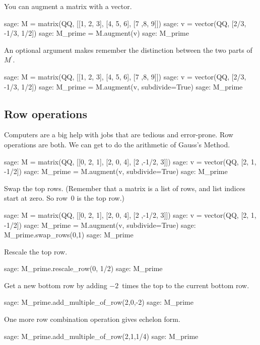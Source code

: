 You can augment a matrix with a vector.
\begin{sagecommandline}
sage: M = matrix(QQ, [[1, 2, 3], [4, 5, 6], [7 ,8, 9]])
sage: v = vector(QQ, [2/3, -1/3, 1/2])
sage: M_prime = M.augment(v)
sage: M_prime
\end{sagecommandline}
\noindent
An optional argument makes 
\Sage{} remember the distinction between the two parts 
of $M^\prime$.
\begin{sagecommandline}
sage: M = matrix(QQ, [[1, 2, 3], [4, 5, 6], [7 ,8, 9]])
sage: v = vector(QQ, [2/3, -1/3, 1/2])
sage: M_prime = M.augment(v, subdivide=True)
sage: M_prime                              
\end{sagecommandline}



\subsection{Row operations}
Computers are a big help with jobs that are tedious and error-prone.
Row operations are both.
We can get \Sage{} to do the arithmetic of Gauss's Method.
\begin{sagecommandline}
sage: M = matrix(QQ, [[0, 2, 1], [2, 0, 4], [2 ,-1/2, 3]])
sage: v = vector(QQ, [2, 1, -1/2])                        
sage: M_prime = M.augment(v, subdivide=True)              
sage: M_prime                                             
\end{sagecommandline}
\noindent
Swap the top rows. 
(Remember that a matrix is a list of rows, 
and list indices start at zero.
So row~$0$ is the top row.)
\begin{sagecommandline}
sage: M = matrix(QQ, [[0, 2, 1], [2, 0, 4], [2 ,-1/2, 3]])
sage: v = vector(QQ, [2, 1, -1/2])                        
sage: M_prime = M.augment(v, subdivide=True)              
sage: M_prime.swap_rows(0,1)
sage: M_prime
\end{sagecommandline}
\noindent
Rescale the top row.
\begin{sagecommandline}
sage: M_prime.rescale_row(0, 1/2)
sage: M_prime
\end{sagecommandline}
\noindent
Get a new  bottom row by adding $-2$~times the top to the current bottom
row.
\begin{sagecommandline}
sage: M_prime.add_multiple_of_row(2,0,-2)
sage: M_prime
\end{sagecommandline}
\noindent
One more row combination operation gives echelon form.
\begin{sagecommandline}
sage: M_prime.add_multiple_of_row(2,1,1/4)
sage: M_prime                             
\end{sagecommandline}

